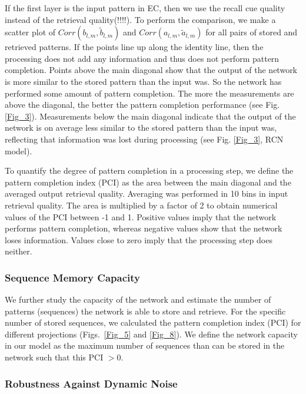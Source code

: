 \documentclass[utf8]{frontiersSCNS} %
\begin{document}
If the first layer is the input pattern in EC, then we use the recall cue quality instead of the retrieval quality(!!!!).
%
To perform the comparison, we make a scatter plot of
$Corr(b_{l, m},\tilde{b}_{l, m})$ and
$Corr(a_{l, m},\tilde{a}_{l, m})$ 
for all pairs of stored and retrieved patterns.
If the points line up along the identity line, then the processing does not add any information and thus does not perform pattern completion. Points above the main diagonal show that the output of the network is more similar to the stored pattern than the input was. So the network has performed some amount of pattern completion. The more the measurements are above the diagonal, the better the pattern completion performance (see Fig. \ref{Fig_3}). Measurements below the main diagonal indicate that the output of the network is on average less similar to the stored pattern than the input was, reflecting that information was lost during processing (see Fig. \ref{Fig_3}, RCN model).

To quantify the degree of pattern completion in a processing step, we define the pattern completion index (PCI) as the area between the main diagonal and the averaged output retrieval quality. Averaging was performed in 10 bins in input retrieval quality. The area is multiplied by a factor of 2 to obtain numerical values of the PCI between -1 and 1. Positive values imply that the network performs pattern completion, whereas negative values show that the network loses information. Values close to zero imply that the processing step does neither. 

\subsubsection*{Sequence Memory Capacity}

We further study the capacity of the network and estimate the number of patterns (sequences) the network is able to store and retrieve. For the specific number of stored sequences, we calculated the pattern completion index (PCI) for different projections (Figs.~\ref{Fig_5} and \ref{Fig_8}). 
We define the network capacity in our model as the maximum number of sequences than can be stored in the network such that this PCI $> 0$.

\subsubsection*{Robustness Against Dynamic Noise}
\end{document}
